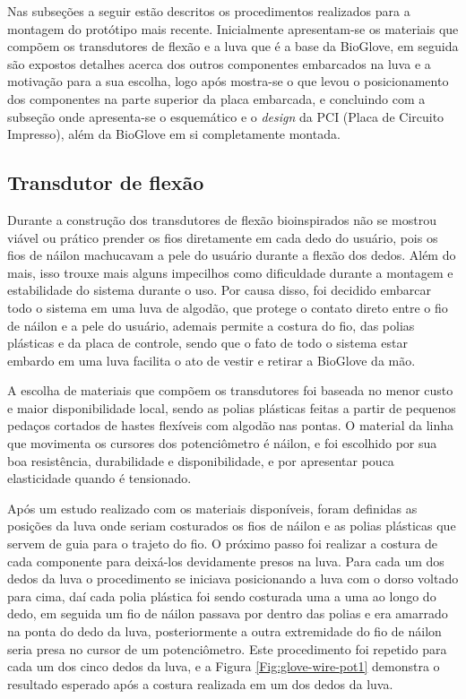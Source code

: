 \documentclass[
	12pt,				%
	openright,			%
	oneside,			%
	a4paper,			%
	english,			%
	brazil				%
	]{abntex2}
\begin{document}
		Nas subseções a seguir estão descritos os procedimentos realizados para a montagem do protótipo mais recente. Inicialmente apresentam-se os materiais que compõem os transdutores de flexão e a luva que é a base da BioGlove, em seguida são expostos detalhes acerca dos outros componentes embarcados na luva e a motivação para a sua escolha, logo após mostra-se o que levou o posicionamento dos componentes na parte superior da placa embarcada, e concluindo com a subseção onde apresenta-se o esquemático e o \textit{design} da PCI (Placa de Circuito Impresso), além da BioGlove em si completamente montada.

		\subsection{Transdutor de flexão}

		Durante a construção dos transdutores de flexão bioinspirados não se mostrou viável ou prático prender os fios diretamente em cada dedo do usuário, pois os fios de náilon machucavam a pele do usuário durante a flexão dos dedos. Além do mais, isso trouxe mais alguns impecilhos como dificuldade durante a montagem e estabilidade do sistema durante o uso. Por causa disso, foi decidido embarcar todo o sistema em uma luva de algodão, que protege o contato direto entre o fio de náilon e a pele do usuário, ademais permite a costura do fio, das polias plásticas e da placa de controle, sendo que o fato de todo o sistema estar embardo em uma luva facilita o ato de vestir e retirar a BioGlove da mão.
		
		A escolha de materiais que compõem os transdutores foi baseada no menor custo e maior disponibilidade local, sendo as polias plásticas feitas a partir de pequenos pedaços cortados de hastes flexíveis com algodão nas pontas. O material da linha que movimenta os cursores dos potenciômetro é náilon, e foi escolhido por sua boa resistência, durabilidade e disponibilidade, e por apresentar pouca elasticidade quando é tensionado.


		Após um estudo realizado com os materiais disponíveis, foram definidas as posições da luva onde seriam costurados os fios de náilon e as polias plásticas que servem de guia para o trajeto do fio. O próximo passo foi realizar a costura de cada componente para deixá-los devidamente presos na luva. Para cada um dos dedos da luva o procedimento se iniciava posicionando a luva com o dorso voltado para cima, daí cada polia plástica foi sendo costurada uma a uma ao longo do dedo, em seguida um fio de náilon passava por dentro das polias e era amarrado na ponta do dedo da luva, posteriormente a outra extremidade do fio de náilon seria presa no cursor de um potenciômetro. Este procedimento foi repetido para cada um dos cinco dedos da luva, e a Figura \ref{Fig:glove-wire-pot1} demonstra o resultado esperado após a costura realizada em um dos dedos da luva.
\end{document}
